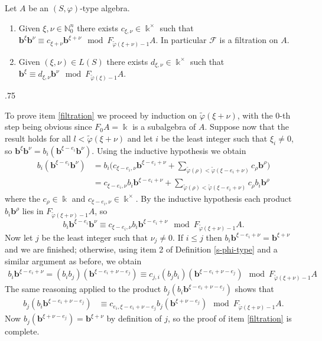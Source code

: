 \documentclass[11pt,fleqn]{article}
\makeatletter
\renewenvironment{proof}[1][\textit{Proof}]{\par
  \pushQED{\qed}%
  \normalfont \topsep.75\paraskip\relax
  \trivlist
  \item[\hskip\labelsep
        \itshape
    #1\@addpunct{.}]\ignorespaces
}{%
  \popQED\endtrivlist\@endpefalse
}
\newcommand\NN{\mathbb N}
\renewcommand\phi{\varphi}
\newcommand\F{\mathcal F}
\newcommand\tphi{\tilde \phi}
\renewcommand\b{\mathbf b}
\renewcommand\k{\Bbbk}
\makeatother
\begin{document}
\begin{Lemma*}
Let $A$ be an $(S, \phi)$-type algebra.
\begin{enumerate}
\item \label{filtration}
Given $\xi, \nu \in \NN_0^n$ there exists $c_{\xi, \nu} \in \k^\times$ such that $\b^\xi
\b^\nu \equiv c_{\xi + \nu}\b^{\xi + \nu} \mod F_{\tphi(\xi + \nu) - 1}A$. In particular 
$\F$ is a filtration on $A$.

\item \label{straight}
Given $(\xi, \nu) \in L(S)$ there exists $d_{\xi, \nu} 
\in \k^\times$ such that $\b^\xi \equiv d_{\xi, \nu} \b^\nu \mod F_{\tphi(\xi) - 1} A$.
\end{enumerate}
\end{Lemma*}
\begin{proof}
To prove item \ref{filtration} we proceed by induction on $\tphi(\xi + \nu)$, with the
$0$-th step being obvious since $F_0A = \k$ is a subalgebra of $A$. Suppose now that the
result holds for all $l < \tphi(\xi + \nu)$ and let $i$ be the least integer such that
$\xi_i \neq 0$, so $\b^\xi \b^\nu = b_i (\b^{\xi - e_i} \b ^\nu)$. Using the inductive
hypothesis we obtain
\begin{align*}
b_i (\b^{\xi - e_i} \b^\nu) 
&= b_i \bigg( c_{\xi- e_i, \nu} \b^{\xi - e_i + \nu} 
  + \sum_{\tphi(\rho) < \tphi(\xi - e_i + \nu)} c_\rho \b^\rho \bigg)\\
&= c_{\xi- e_i, \nu} b_i \b^{\xi - e_i + \nu} 
  + \sum_{\tphi(\rho) < \tphi(\xi - e_i + \nu)} c_\rho b_i \b^\rho
\end{align*}
where the $c_\rho \in \k$ and $c_{\xi - e_i,\nu} \in \k^\times$. By the inductive  
hypothesis each product $b_i \b^\rho$ lies in $F_{\tphi(\xi + \nu) -1} A$, so
\[
	b_i \b^{\xi - e_i} \b^\nu \equiv c_{\xi- e_i, \nu}b_i \b^{\xi - e_i + \nu} \mod
	F_{\tphi(\xi + \nu)-1}A.
\]
Now let $j$ be the least integer such that $\nu_j \neq 0$. If $i \leq j$ then $b_i 
\b^{\xi - e_i + \nu} = \b^{\xi + \nu}$ and we are finished; otherwise, using item 2 of 
Definition \ref{s-phi-type} and a similar argument as before, we obtain
\begin{align*}
	b_i \b^{\xi - e_i + \nu} = (b_i b_j)(\b^{\xi - e_i + \nu - e_j}) \equiv c_{j,i} (b_j
	b_i)(\b^{\xi - e_i + \nu - e_j}) \mod F_{\tphi(\xi + \nu) - 1}A
\end{align*}
The same reasoning applied to the product $b_j(b_i\b^{\xi - e_i + \nu - e_j})$ shows that
\begin{align*}
	b_j (b_i \b^{\xi - e_i + \nu - e_j}) 
		&\equiv c_{e_i, \xi - e_i + \nu - e_j} b_j(\b^{\xi	+ \nu - e_j}) \mod
  F_{\tphi(\xi + \nu) - 1}A.
\end{align*}
Now $b_j(\b^{\xi  + \nu - e_j}) = \b^{\xi + \nu}$ by definition of $j$, so the proof of
item \ref{filtration} is complete.


\end{proof}
\end{document}

